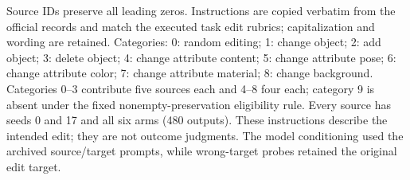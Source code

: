 \begin{table}[!t]
\begin{minipage}{6.9in}
{\raggedright Source IDs preserve all leading zeros. Instructions are copied verbatim from the official records and match the executed task edit rubrics; capitalization and wording are retained. Categories: 0: random editing; 1: change object; 2: add object; 3: delete object; 4: change attribute content; 5: change attribute pose; 6: change attribute color; 7: change attribute material; 8: change background. Categories 0--3 contribute five sources each and 4--8 four each; category 9 is absent under the fixed nonempty-preservation eligibility rule. Every source has seeds 0 and 17 and all six arms (480 outputs). These instructions describe the intended edit; they are not outcome judgments. The model conditioning used the archived source/target prompts, while wrong-target probes retained the original edit target.\par}
\end{minipage}
\end{table}
